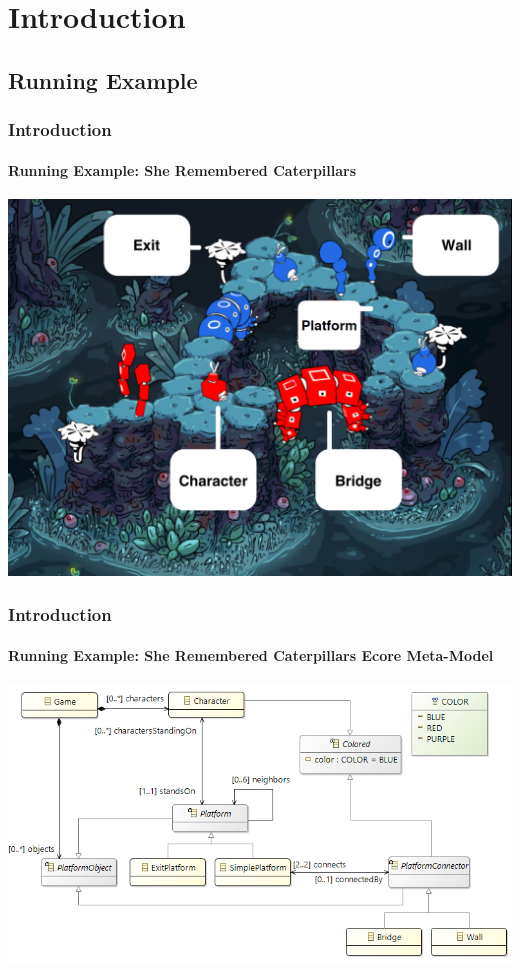 
\section{Introduction}

\subsection{Running Example}
	\begin{frame}
		\frametitle{Introduction}
		\framesubtitle{Running Example: She Remembered Caterpillars}
		\begin{center}
			\vspace{-4mm}
			\includegraphics[height=.82\textheight]{../common/figures/she-remembered-caterpillars-game}
		\end{center}
	\end{frame}
	\begin{frame}
		\frametitle{Introduction}
		\framesubtitle{Running Example: She Remembered Caterpillars Ecore Meta-Model}
		\begin{center}
			\includegraphics[width=\linewidth]{../common/figures/she-remembered-caterpillars-class-diagram}
		\end{center}
	\end{frame}

